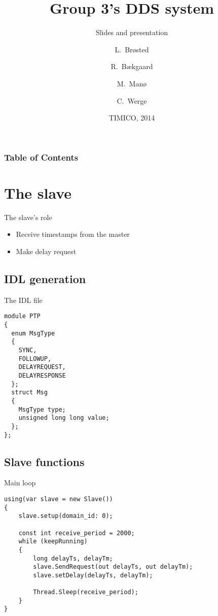 \documentclass[compressed, presentation, notheorems, 12pt]{beamer}
\title{Group 3's DDS system}
\subtitle{Slides and presentation}
\author[Author, Anders] %
{L.~Brøsted \and R.~Bækgaard \and M.~Manø \and C.~Werge}
\institute
{
  Aarhus University \\
  School of Engineering
}
\date{TIMICO, 2014}
\begin{document}
 	\frame{\titlepage}

\begin{frame}
\frametitle{Table of Contents}
\tableofcontents%
\end{frame}

	
\section{The slave}
	\begin{frame}{The slave's role}	

	\begin{itemize}
		\item Receive timestamps from the master
		\item Make delay request
	\end{itemize}
	
	\end{frame}


\subsection{IDL generation}
	\begin{frame}[containsverbatim]{The IDL file}

	\begin{lstlisting}[style=Code-C++]
module PTP
{
  enum MsgType
  {
    SYNC,
    FOLLOWUP,
    DELAYREQUEST,
    DELAYRESPONSE
  };
  struct Msg
  {
    MsgType type;         
    unsigned long long value;     
  };
};
	\end{lstlisting}
	\end{frame}



\subsection{Slave functions}

	\begin{frame}[containsverbatim]{Main loop}
	
	\begin{lstlisting}[style=Code-C++]
using(var slave = new Slave())
{
	slave.setup(domain_id: 0);
	
	const int receive_period = 2000; 
	while (keepRunning)
	{
		long delayTs, delayTm;
		slave.SendRequest(out delayTs, out delayTm);
		slave.setDelay(delayTs, delayTm);

		Thread.Sleep(receive_period);
	}
}
	\end{lstlisting}

	\end{frame}
\end{document}
